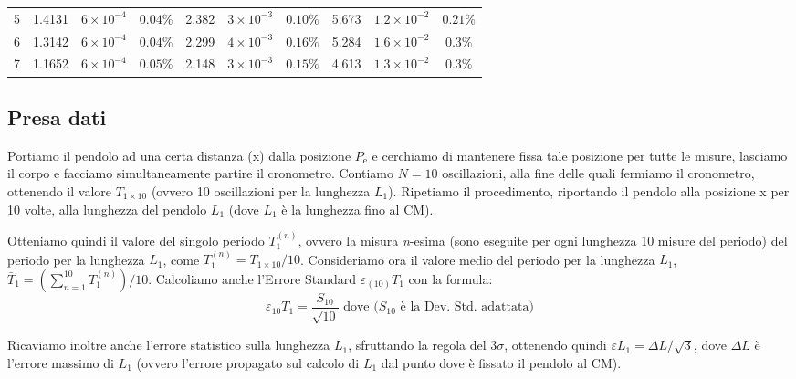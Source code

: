\documentclass[italian, a4paper, 10pt, twocolumn]{../../style/lab_unige}
\begin{document}
\begin{table}[t!]
\begin{tabular}{lccccccccc}
      5 & 1.4131  & $6\times10^{-4}$    & $0.04\%$          & 2.382          & $3\times10^{-3}$         & $0.10\%$  & 5.673             & $1.2\times10^{-2}$           & $0.21\%$      \\[+0.5ex] %
      6 & 1.3142  & $6\times10^{-4}$    & $0.04\%$          & 2.299          & $4\times10^{-3}$         & $0.16\%$  & 5.284             & $1.6\times10^{-2}$           & $0.3\%$       \\[+0.5ex] %
      7 & 1.1652  & $6\times10^{-4}$    & $0.05\%$          & 2.148          & $3\times10^{-3}$         & $0.15\%$  & 4.613             & $1.3\times10^{-2}$           & $0.3\%$       \\[+0.5ex] %
      \hline
    \end{tabular}
  \end{table}

  \subsection{Presa dati}
  \label{section:presa_dati}
  Portiamo il pendolo ad una certa distanza (x) dalla posizione $P_{\text{e}}$ e cerchiamo di mantenere 
  fissa tale posizione per tutte le misure, 
  lasciamo il corpo e facciamo simultaneamente partire il cronometro. Contiamo $N=10$ oscillazioni, alla 
  fine delle quali fermiamo il cronometro, ottenendo il valore $T_{1\times10}$ (ovvero 10 oscillazioni 
  per la lunghezza $L_{1}$). Ripetiamo il procedimento, riportando il pendolo alla posizione x per 10 
  volte, alla lunghezza del pendolo $L_{1}$ (dove $L_{1}$ è la lunghezza fino al CM). 

  Otteniamo quindi il valore del singolo periodo $T_{1}^{(n)}$, ovvero la misura \textit{n}-esima 
  (sono eseguite per ogni lunghezza 10 misure del periodo) del periodo per la 
  lunghezza $L_{1}$, come $T_{1}^{(n)}=T_{1\times10}/10$. 
  Consideriamo ora il valore medio del periodo per la lunghezza $L_{1}$, 
  $\bar{T}_{1}=\left(\sum_{n=1}^{10}T_{1}^{(n)}\right)/10$.
  Calcoliamo anche l'Errore Standard $\varepsilon_{(10)}T_{1}$ con la formula:
  \[
    \varepsilon_{10}T_{1}=\frac{S_{10}}{\sqrt{10}} \text{  dove (}S_{10}\text{ è la Dev. Std. adattata)}
  \]

  Ricaviamo inoltre anche l'errore statistico sulla lunghezza $L_{1}$, sfruttando la regola del $3\sigma$, 
  ottenendo quindi $\varepsilon L_{1}=\Delta L/\sqrt{3}$, dove $\Delta L$ è l'errore massimo di $L_{1}$ 
  (ovvero l'errore propagato sul calcolo di $L_{1}$ dal punto dove è fissato il pendolo al CM).
  
\end{document}
